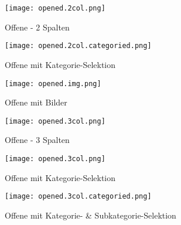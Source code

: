 \begin{figure}[!htb]
    \centering
    \begin{minipage}[b]{0.45\textwidth}
        \centering
        \texttt{[image: opened.2col.png]}
        \caption{Offene  - 2 Spalten}
        \label{img:openedTwoColNewComp}
    \end{minipage}
    \hfill
    \begin{minipage}[b]{0.45\textwidth}
        \centering
        \texttt{[image: opened.2col.categoried.png]}
        \caption{Offene  mit Kategorie-Selektion}
        \label{img:openedTwoColCatNewComp}
    \end{minipage}
\end{figure}

\begin{figure}[!htb]
    \centering
    \begin{minipage}[b]{0.45\textwidth}
        \centering
        \texttt{[image: opened.img.png]}
        \caption{Offene  mit Bilder}
        \label{img:openedTwoColImgNewComp}
    \end{minipage}
    \hfill
    \begin{minipage}[b]{0.45\textwidth}
        \centering
        \texttt{[image: opened.3col.png]}
        \caption{Offene  - 3 Spalten}
        \label{img:openedThreeColNewComp}
    \end{minipage}
\end{figure}

\begin{figure}[!htb]
    \centering
    \begin{minipage}[b]{0.45\textwidth}
        \centering
        \texttt{[image: opened.3col.png]}
        \caption{Offene  mit Kategorie-Selektion}
        \label{img:openedThreeColCatNewComp}
    \end{minipage}
    \hfill
    \begin{minipage}[b]{0.45\textwidth}
        \centering
        \texttt{[image: opened.3col.categoried.png]}
        \caption{Offene  mit Kategorie- \& Subkategorie-Selektion}
        \label{img:openedThreeColCatSubcatNewComp}
    \end{minipage}
\end{figure}
